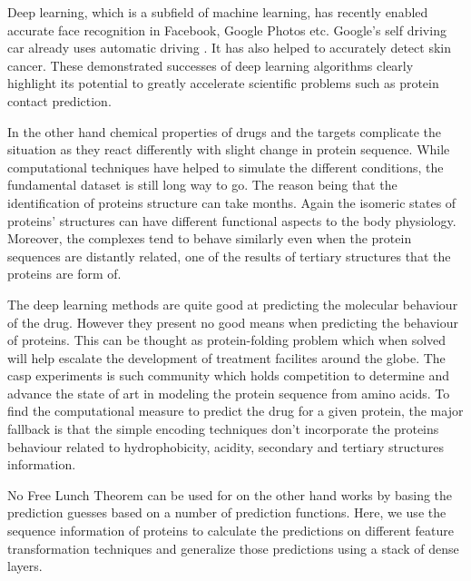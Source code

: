 Deep learning, which is a subfield of machine learning, has recently enabled accurate face recognition in Facebook, Google Photos etc. Google’s self driving car already uses automatic driving \cite{Becker2008}. It has also helped to accurately detect skin cancer. These demonstrated successes of deep learning algorithms clearly highlight its potential to greatly accelerate scientific problems such as protein contact prediction. 

In the other hand chemical properties of drugs and the targets complicate the situation as they react differently with slight change in protein sequence. While computational techniques have helped to simulate the different conditions, the fundamental dataset is still long way to go. The reason being that the identification of proteins structure can take months. Again the isomeric states of proteins' structures can have different functional aspects to the body physiology. Moreover, the complexes tend to behave similarly even when the protein sequences are distantly related, one of the results of tertiary structures that the proteins are form of. \cite{Choudhuri2014}

The deep learning methods are quite good at predicting the molecular behaviour of the drug. However they present no good means when predicting the behaviour of proteins. This can be thought as protein-folding problem which when solved will help escalate the development of treatment facilites around the globe. The \acrfull{casp} experiments is such community which holds competition to determine and advance the state of art in modeling the protein sequence from amino acids.\cite{Gooch2011} To find the computational measure to predict the drug for a given protein, the major fallback is that the simple encoding techniques don’t incorporate the proteins behaviour related to hydrophobicity, acidity, secondary and tertiary structures information.\cite{Wong2018}

No Free Lunch Theorem \cite{Wolpert2005} can be used for  on the other hand works by basing the prediction guesses based on a number of prediction functions. Here, we use the sequence information of proteins to calculate the predictions on different feature transformation techniques and generalize those predictions using a stack of dense layers.
